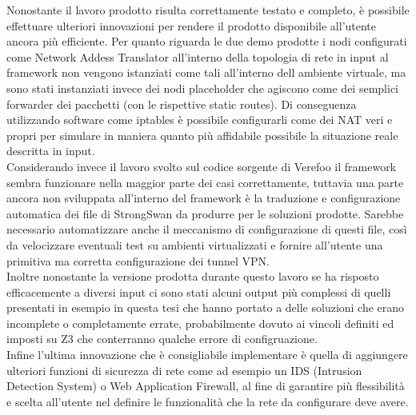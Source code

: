 Nonostante il lavoro prodotto risulta correttamente testato e completo, è possibile effettuare ulteriori innovazioni per rendere il prodotto disponibile all'utente
ancora più efficiente. Per quanto riguarda le due demo prodotte i nodi configurati come Network Addess Translator all'interno della topologia di rete in input al framework
non vengono istanziati come tali all'interno dell ambiente virtuale, ma sono stati instanziati invece dei nodi placeholder che agiscono come dei semplici forwarder dei pacchetti (con le rispettive static routes).
Di conseguenza utilizzando software come iptables è possibile configurarli come dei NAT veri e propri per simulare in maniera quanto più affidabile possibile la situazione reale descritta in input.
\\
Considerando invece il lavoro svolto sul codice sorgente di Verefoo il framework sembra funzionare nella maggior parte dei casi correttamente, tuttavia una parte ancora non sviluppata all'interno del framework è la 
traduzione e configurazione automatica dei file di StrongSwan da produrre per le soluzioni prodotte. Sarebbe necessario automatizzare anche il meccanismo di configurazione di questi file, così da velocizzare eventuali
test su ambienti virtualizzati e fornire all'utente una primitiva ma corretta configurazione dei tunnel VPN.\\
Inoltre nonostante la versione prodotta durante questo lavoro se ha risposto efficacemente a diversi input ci sono stati alcuni output più complessi di quelli presentati in esempio in questa tesi che hanno portato a delle soluzioni
che erano incomplete o completamente errate, probabilmente dovuto ai vincoli definiti ed imposti su Z3 che conterranno qualche errore di configruazione.\\

Infine l'ultima innovazione che è consigliabile implementare è quella di aggiungere ulteriori funzioni di sicurezza di rete come ad esempio un IDS (Intrusion Detection System) o Web Application Firewall, al fine di garantire più
flessibilità e scelta all'utente nel definire le funzionalità che la rete da configurare deve avere.